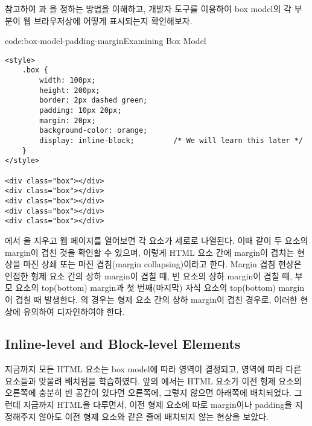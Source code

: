 \을 참고하여 과 을 정하는 방법을 이해하고, 개발자 도구를 이용하여 box model의 각 부분이 웹 브라우저상에 어떻게 표시되는지 확인해보자.

\begin{codeenv}{code:box-model-padding-margin}{Examining Box Model}\begin{verbatim}
<style>
    .box {
        width: 100px;
        height: 200px;
        border: 2px dashed green;
        padding: 10px 20px;
        margin: 20px;
        background-color: orange;
        display: inline-block;         /* We will learn this later */
    }
</style>

<div class="box"></div>
<div class="box"></div>
<div class="box"></div>
<div class="box"></div>
<div class="box"></div>
\end{verbatim}
\end{codeenv}

에서 을 지우고 웹 페이지를 열어보면 각  요소가 세로로 나열된다. 이때 \과 같이 두 요소의 margin이 겹친 것을 확인할 수 있으며, 이렇게 HTML 요소 간에 margin이 겹치는 현상을 마진 상쇄 또는 마진 겹침(margin collapsing)이라고 한다. Margin 겹침 현상은 인접한 형제 요소 간의 상하 margin이 겹칠 때, 빈 요소의 상하 margin이 겹칠 때, 부모 요소의 top(bottom) margin과 첫 번째(마지막) 자식 요소의 top(bottom) margin이 겹칠 때 발생한다. 의 경우는 형제 요소 간의 상하 margin이 겹친 경우로, 이러한 현상에 유의하여 디자인하여야 한다.


\subsection*{Inline-level and Block-level Elements}

지금까지 모든 HTML 요소는 box model에 따라 영역이 결정되고, 영역에 따라 다른 요소들과 맞물려 배치됨을 학습하였다. 앞의 에서는 HTML 요소가 이전 형제 요소의 오른쪽에 충분히 빈 공간이 있다면 오른쪽에, 그렇지 않으면 아래쪽에 배치되었다. 그런데 지금까지 HTML을 다루면서, 이전 형제 요소에 따로 margin이나 padding을 지정해주지 않아도 이전 형제 요소와 같은 줄에 배치되지 않는 현상을 보았다.

